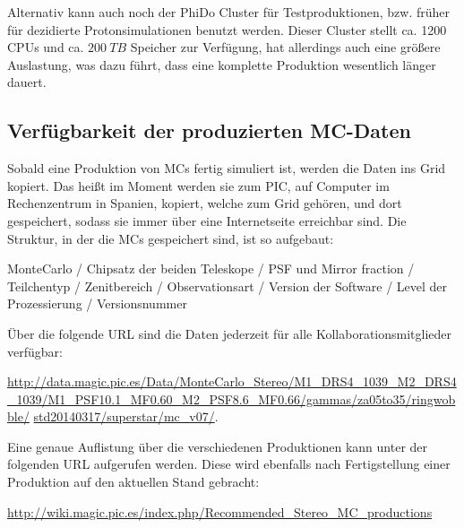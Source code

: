 Alternativ kann auch noch der PhiDo Cluster für Testproduktionen, bzw. früher für dezidierte Protonsimulationen benutzt werden. 
Dieser Cluster stellt ca. 1200 CPUs und ca. $\SI{200}{TB}$ Speicher zur Verfügung, hat allerdings auch eine größere Auslastung, was dazu führt, dass eine komplette Produktion wesentlich länger dauert.



\subsection{Verfügbarkeit der produzierten MC-Daten}
\label{sec:Wenn die MCs fertig sind}
Sobald eine Produktion von MCs fertig simuliert ist, werden die Daten ins Grid kopiert.
Das heißt im Moment werden sie zum PIC, auf Computer im Rechenzentrum in Spanien, kopiert, welche zum Grid gehören, und dort gespeichert, sodass sie immer über eine Internetseite erreichbar sind.
Die Struktur, in der die MCs gespeichert sind, ist so aufgebaut:\newline 

MonteCarlo / Chipsatz der beiden Teleskope / PSF und Mirror fraction / Teilchentyp / Zenitbereich / Observationsart / Version der Software / Level der Prozessierung / Versionsnummer \newline

Über die folgende URL sind die Daten jederzeit für alle Kollaborationsmitglieder verfügbar:

\url{http://data.magic.pic.es/Data/MonteCarlo_Stereo/M1_DRS4_1039_M2_DRS4_1039/M1_PSF10.1_MF0.60_M2_PSF8.6_MF0.66/gammas/za05to35/ringwobble/}\newline
\url{std20140317/superstar/mc_v07/}.

Eine genaue Auflistung über die verschiedenen Produktionen kann unter der folgenden URL aufgerufen werden.
Diese wird ebenfalls nach Fertigstellung einer Produktion auf den aktuellen Stand gebracht:

\url{http://wiki.magic.pic.es/index.php/Recommended_Stereo_MC_productions}


